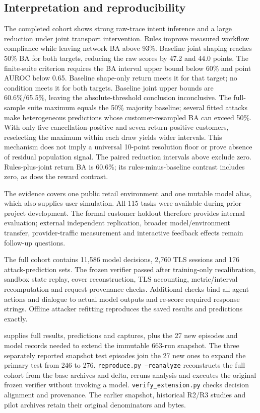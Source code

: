 \subsection{Interpretation and reproducibility}
The completed cohort shows strong raw-trace intent inference and a large reduction under joint transport intervention. Rules improve measured workflow compliance while leaving network BA above 93\%. Baseline joint shaping reaches 50\% BA for both targets, reducing the raw scores by 47.2 and 44.0 points. The finite-suite criterion requires the BA interval upper bound below 60\% and point AUROC below 0.65. Baseline shape-only return meets it for that target; no condition meets it for both targets. Baseline joint upper bounds are 60.6\%/65.5\%, leaving the absolute-threshold conclusion inconclusive. The full-sample suite maximum equals the 50\% majority baseline; several fitted attacks make heterogeneous predictions whose customer-resampled BA can exceed 50\%. With only five cancellation-positive and seven return-positive customers, reselecting the maximum within each draw yields wider intervals. This mechanism does not imply a universal 10-point resolution floor or prove absence of residual population signal. The paired reduction intervals above exclude zero. Rules-plus-joint return BA is 60.6\%; its rules-minus-baseline contrast includes zero, as does the reward contrast.

The evidence covers one public retail environment and one mutable model alias, which also supplies user simulation. All 115 tasks were available during prior project development. The formal customer holdout therefore provides internal evaluation; external independent replication, broader model/environment transfer, provider-traffic measurement and interactive feedback effects remain follow-up questions.

The full cohort contains 11,586 model decisions, 2,760 TLS sessions and 176 attack-prediction sets. The frozen verifier passed after training-only recalibration, sandbox state replay, cover reconstruction, TLS accounting, metric/interval recomputation and request-provenance checks. Additional checks bind all agent actions and dialogue to actual model outputs and re-score required response strings. Offline attacker refitting reproduces the saved results and predictions exactly.

 supplies full results, predictions and captures, plus the 27 new episodes and model records needed to extend the immutable 663-run snapshot. The three separately reported snapshot test episodes join the 27 new ones to expand the primary test from 246 to 276. \texttt{reproduce.py --reanalyze} reconstructs the full cohort from the base archives and delta, reruns analysis and executes the original frozen verifier without invoking a model. \texttt{verify\_extension.py} checks decision alignment and provenance. The earlier snapshot, historical R2/R3 studies and pilot archives retain their original denominators and bytes.
